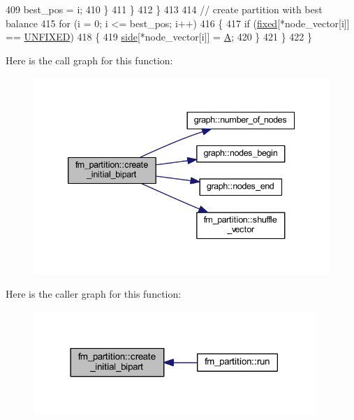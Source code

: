 \begin{DoxyCode}
409         best\_pos = i;
410         \}
411     \}
412     \}
413 
414     \textcolor{comment}{// create partition with best balance}
415     \textcolor{keywordflow}{for} (i = 0; i <= best\_pos; i++)
416     \{
417     \textcolor{keywordflow}{if} (\mbox{\hyperlink{classfm__partition_a3b04658dbb5b27ddd20194ff74a71082}{fixed}}[*node\_vector[i]] == \mbox{\hyperlink{classfm__partition_a24447561db0ea633212c597c5e1fca56}{UNFIXED}})
418     \{
419         \mbox{\hyperlink{classfm__partition_af83309e781e9658fc0ff923ced087bfc}{side}}[*node\_vector[i]] = \mbox{\hyperlink{classfm__partition_a738e75c601403754e61e6dac623fd3ab}{A}};
420     \}
421     \}
422 \}
\end{DoxyCode}
Here is the call graph for this function\+:\nopagebreak
\begin{figure}[H]
\begin{center}
\leavevmode
\includegraphics[width=339pt]{classfm__partition_a25ef3fc22bee176abfef64248484e8c0_cgraph}
\end{center}
\end{figure}
Here is the caller graph for this function\+:\nopagebreak
\begin{figure}[H]
\begin{center}
\leavevmode
\includegraphics[width=302pt]{classfm__partition_a25ef3fc22bee176abfef64248484e8c0_icgraph}
\end{center}
\end{figure}
\mbox{\label{classfm__partition_a36990b62c6d2d9e4948f42d805afc626}} 
